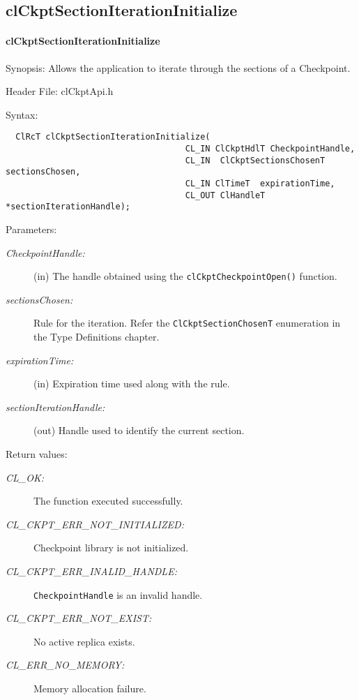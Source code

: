 \begin{flushleft}
\subsection{clCkptSectionIterationInitialize} 
\hypertarget{pageckpt113}{}\paragraph{cl\-Ckpt\-Section\-Iteration\-Initialize}\label{pageckpt113}
\begin{Desc}
\item[Synopsis:]Allows the application to iterate through the sections of a Checkpoint.\end{Desc}
\begin{Desc}
\item[Header File:]clCkptApi.h\end{Desc}
\begin{Desc}
\item[Syntax:]

\footnotesize\begin{verbatim}  ClRcT clCkptSectionIterationInitialize(
                              		CL_IN ClCkptHdlT CheckpointHandle,
                              		CL_IN  ClCkptSectionsChosenT   sectionsChosen,
                              		CL_IN ClTimeT  expirationTime,
                              		CL_OUT ClHandleT *sectionIterationHandle);
\end{verbatim}
\normalsize
\end{Desc}
\begin{Desc}
\item[Parameters:]
\begin{description}
\item[{\em Checkpoint\-Handle:}](in) The handle obtained using the {\tt{clCkptCheckpointOpen()}} function. 
\item[{\em sections\-Chosen:}]Rule for the iteration. Refer the {\tt{Cl\-Ckpt\-Section\-Chosen\-T}} enumeration in the Type Definitions chapter. 
\item[{\em expiration\-Time:}](in) Expiration time used along with the rule. 
\item[{\em section\-Iteration\-Handle:}](out) Handle used to identify the current section.\end{description}
\end{Desc}
\begin{Desc}
\item[Return values:]
\begin{description}
\item[{\em CL\_\-OK:}]The function executed successfully.
\item[{\em CL\_\-CKPT\_\-ERR\_\-NOT\_\-INITIALIZED:}]Checkpoint library is not initialized. 
\item[{\em CL\_\-CKPT\_\-ERR\_\-INALID\_\-HANDLE:}]{\tt{CheckpointHandle}} is an invalid handle.
\item[{\em CL\_\-CKPT\_\-ERR\_\-NOT\_\-EXIST:}] No active replica exists.
\item[{\em CL\_\-ERR\_\-NO\_\-MEMORY:}]Memory allocation failure.


\end{description}
\end{Desc}
\end{flushleft}
